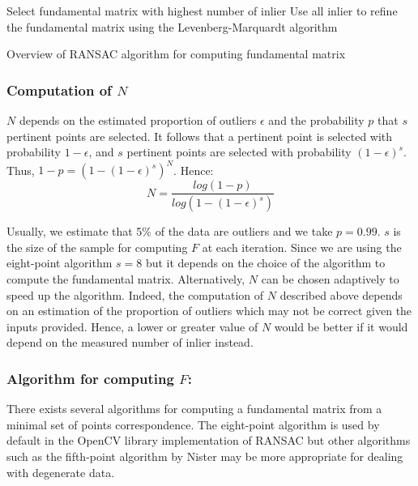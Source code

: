 \documentclass[11pt]{report}
\begin{document}
\begin{algorithm}[H]
  Select fundamental matrix with highest number of inlier\;
  Use all inlier to refine the fundamental matrix using the Levenberg-Marquardt algorithm
 \caption{Overview of RANSAC algorithm for computing fundamental matrix}
\end{algorithm}

\subsubsection{Computation of $N$}

$N$ depends on the estimated proportion of outliers $\epsilon$ and the probability $p$ that $s$ pertinent points are selected. It follows that a pertinent point is selected with probability $1 - \epsilon$, and $s$ pertinent points are selected with probability $(1 - \epsilon)^s$. Thus, $1 - p = (1 - (1 - \epsilon)^s)^N$. Hence:
\[
    N = \frac{log(1 - p)}{log(1 - (1 - \epsilon)^s)}
\]

Usually, we estimate that 5\% of the data are outliers and we take $p=0.99$. $s$ is the size of the sample for computing $F$ at each iteration. Since we are using the eight-point algorithm $s=8$ but it depends on the choice of the algorithm to compute the fundamental matrix. Alternatively, $N$ can be chosen adaptively to speed up the algorithm. Indeed, the computation of $N$ described above depends on an estimation of the proportion of outliers which may not be correct given the inputs provided. Hence, a lower or greater value of $N$ would be better if it would depend on the measured number of inlier instead.

\subsubsection{Algorithm for computing $F$:}

There exists several algorithms for computing a fundamental matrix from a minimal set of points correspondence. The eight-point algorithm is used by default in the OpenCV library implementation of RANSAC but other algorithms such as the fifth-point algorithm by Nister\cite{FivePointNister04} may be more appropriate for dealing with degenerate data.
\end{document}

